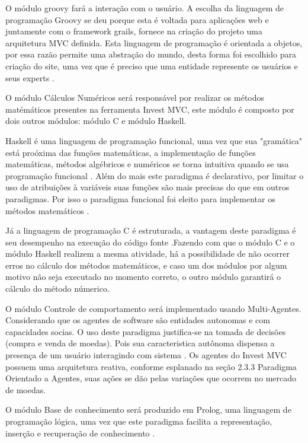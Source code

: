 O módulo groovy fará a interação com o usuário. A escolha da linguagem de programação Groovy se deu porque esta é voltada para aplicações web e juntamente com  o framework grails, fornece na criação do projeto uma arquitetura MVC definida. Esta linguagem de programação é orientada a objetos, por essa razão permite uma abstração do mundo, desta forma foi escolhido para  criação do site, uma vez que é preciso que uma entidade represente os usuários e seus experts \cite[pág.~13]{stefanov2008}.

O módulo Cálculos Numéricos será responsável por realizar os métodos matémáticos presentes na ferramenta Invest MVC, este módulo é composto por dois outros módulos: módulo C e módulo Haskell.

Haskell é uma linguagem de programação funcional, uma vez que sua "gramática" está proóxima das funções matemáticas, a implementação de funções matemáticas, métodos algébricos e numéricos se torna intuitiva quando se usa programação funcional \cite{hoogle2013}. Além do mais este paradigma é declarativo, por limitar o uso de atribuições à variáveis suas funções são mais precisas do que em outros paradigmas. Por isso o paradigma funcional foi eleito para implementar os métodos matemáticos \cite{piponi2006}.

Já a linguagem de programação C é estruturada, a vantagem deste paradigma é seu desempenho na execução do código fonte \cite{gustavo}.Fazendo com que o módulo C e o módulo Haskell realizem a mesma atividade, há a possibilidade de não ocorrer erros no cálculo dos métodos matemáticos, e caso um dos módulos por algum motivo não seja executado no momento correto, o outro módulo garantirá o cálculo do método númerico.

O módulo Controle de comportamento será implementado usando Multi-Agentes. Considerando que os agentes de software são entidades autonomas e com capacidades socias. O uso deste paradigma justifica-se na tomada de decisões (compra e venda de moedas). Pois sua  caracteristica autônoma dispensa a presença de um usuário interagindo com sistema \cite{agentBuilderWhy}. Os agentes do Invest MVC possuem uma arquitetura reativa, conforme esplanado na seção 2.3.3 Paradigma Orientado a Agentes, suas ações se dão pelas variações que ocorrem no  mercado de moedas.

O módulo Base de conhecimento será produzido em Prolog, uma linguagem de programação lógica,  uma vez que este  paradigma facilita a representação, inserção e recuperação de conhecimento \cite{almeida2010}.

